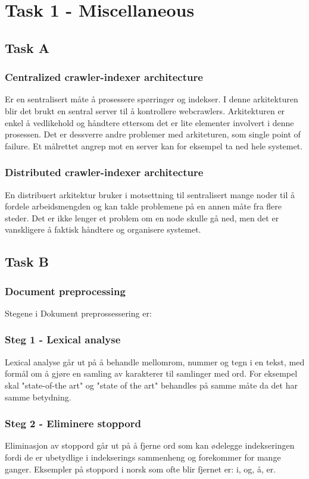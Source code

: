 \section*{Task 1 - Miscellaneous}

\subsection*{Task A}
\subsubsection*{Centralized crawler-indexer architecture}
Er en sentralisert måte å prosessere spørringer og indekser. I denne arkitekturen blir det brukt en sentral server til å kontrollere webcrawlers. Arkitekturen er enkel å vedlikehold og håndtere ettersom det er lite elementer involvert i denne prosessen. Det er dessverre andre problemer med arkiteturen, som single point of failure. Et målrettet angrep mot en server kan for eksempel ta ned hele systemet.

\subsubsection*{Distributed crawler-indexer architecture}
En distribuert arkitektur bruker i motsettning til sentralisert mange noder til å fordele arbeidsmengden og kan takle problemene på en annen måte fra flere steder. Det er ikke lenger et problem om en node skulle gå ned, men det er vanskligere å faktisk håndtere og organisere systemet.

\subsection*{Task B}
\subsubsection*{Document preprocessing}
Stegene i Dokument preprossessering er:

\subsubsection*{Steg 1 - Lexical analyse}
Lexical analyse går ut på å behandle mellomrom, nummer og tegn i en tekst, med formål om å gjøre en samling av karakterer til samlinger med ord. For eksempel skal "state-of-the art" og "state of the art" behandles på samme måte da det har samme betydning.

\subsubsection*{Steg 2 - Eliminere stoppord}
Eliminasjon av stoppord går ut på å fjerne ord som kan ødelegge indekseringen fordi de er ubetydlige i indekserings sammenheng og forekommer for mange ganger. Eksempler på stoppord i norsk som ofte blir fjernet er: i, og, å, er.

